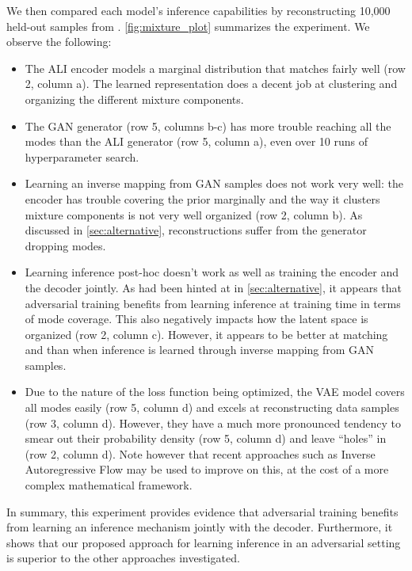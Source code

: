 \documentclass{article}
\begin{document}
We then compared each model’s inference capabilities by reconstructing 10,000
held-out samples from . \autoref{fig:mixture_plot} summarizes the
experiment. We observe the following:
\begin{itemize}
    \item The ALI encoder models a marginal distribution  that
        matches  fairly well (row 2, column a). The learned
        representation does a decent job at clustering and organizing the
        different mixture components.
    \item The GAN generator (row 5, columns b-c) has more trouble reaching all
        the modes than the ALI generator (row 5, column a), even over 10 runs of
        hyperparameter search.
    \item Learning an inverse mapping from GAN samples does not work very well:
        the encoder has trouble covering the prior marginally and the way it
        clusters mixture components is not very well organized (row 2, column
        b). As discussed in \autoref{sec:alternative}, reconstructions suffer
        from the generator dropping modes.
    \item Learning inference post-hoc doesn't work as well as training the
        encoder and the decoder jointly. As had been hinted at in
        \autoref{sec:alternative}, it appears that adversarial training benefits
        from learning inference at training time in terms of mode coverage. This
        also negatively impacts how the latent space is organized (row 2, column
        c). However, it appears to be better at matching  and
         than when inference is learned through inverse mapping from
        GAN samples.
    \item Due to the nature of the loss function being optimized, the VAE model
        covers all modes easily (row 5, column d) and excels at reconstructing
        data samples (row 3, column d). However, they have a much more
        pronounced tendency to smear out their probability density (row 5,
        column d) and leave ``holes'' in  (row 2, column d). Note
        however that recent approaches such as Inverse Autoregressive Flow
        \citep{kingma2016improving} may be used to improve on this, at the cost
        of a more complex mathematical framework.
\end{itemize}

In summary, this experiment provides evidence that adversarial training benefits
from learning an inference mechanism jointly with the decoder.  Furthermore, it
shows that our proposed approach for learning inference in an adversarial
setting is superior to the other approaches investigated.
\end{document}
